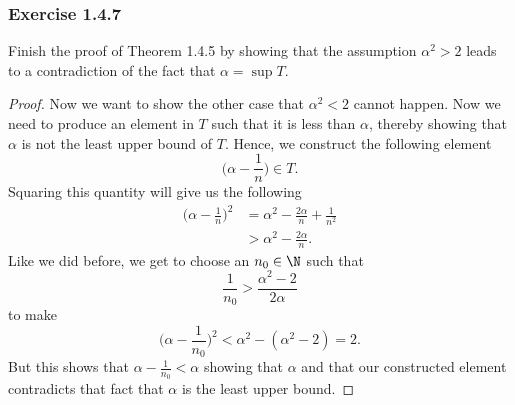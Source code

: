     \subsubsection{Exercise 1.4.7}

    Finish the proof of Theorem 1.4.5 by showing that the assumption \( \alpha ^2 > 2 \) leads to a contradiction of the fact that \( \alpha = \sup T \). 
        
        
    
    \begin{proof}
        Now we want to show the other case that \( \alpha^2 < 2 \) cannot happen. Now we need to produce an element in \( T \) such that it is less than \( \alpha \), thereby showing that \( \alpha \) is not the least upper bound of \( T \). Hence, we construct the following element 
        \[ \bigg(\alpha - \frac{1}{n}\bigg)\in T. \]
        Squaring this quantity will give us the following
        \begin{align*}
            \bigg(\alpha - \frac{1}{n}\bigg)^2 &= \alpha^2 -\frac{2\alpha}{n} + \frac{1}{n^2} \\
            &> \alpha^2 - \frac{2 \alpha}{n}.
        \end{align*}
        Like we did before, we get to choose an \( n_0 \in \N \) such that 
        \[ \frac{1}{n_0} > \frac{\alpha^2 - 2}{2 \alpha} \]
        to make 
        \[\bigg(\alpha - \frac{1}{n_0}\bigg)^2 < \alpha^2 - (\alpha^2 - 2) = 2.\]
        But this shows that \( \alpha - \frac{1}{n_0} < \alpha \) showing that \( \alpha \) and that our constructed element contradicts that fact that \( \alpha\) is the least upper bound. 
    \end{proof}


